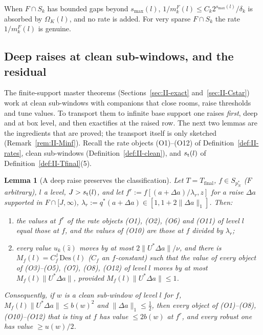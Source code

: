 \documentclass[10pt]{amsart}
\newtheorem{lemma}[theorem]{Lemma}
\theoremstyle{definition}
\theoremstyle{remark}
\newcommand{\zh}{\hat z}
\begin{document}
When $F\cap S_k$ has bounded gaps beyond $s_{\max}(l)$, $1/m^F_k(l)\le
C_k2^{s_{\max}(l)}/\delta_k$ is absorbed by $\Omega_K(l)$, and no rate is
added.  For very sparse $F\cap S_k$ the rate $1/m^F_k(l)$ is genuine.

\subsection{Deep raises at clean sub-windows, and the residual}
\label{subsec:II-residualinf}

The finite-support master theorems (Sections~\ref{sec:II-exact}
and~\ref{sec:II-Cstar}) work at clean sub-windows with companions that close
rooms, raise thresholds and tune values.  To transport them to infinite base
support one raises \emph{first}, deep and at box level, and then
exactifies at the raised row.  The next two lemmas are the ingredients that
are proved; the transport itself is only sketched
(Remark~\ref{rem:II-Minf}).  Recall the rate objects (O1)--(O12) of
Definition~\ref{def:II-rates}, clean sub-windows
(Definition~\ref{def:II-clean}), and $s_{\rm t}(l)$ of
Definition~\ref{def:II-Tfinal}(5).

\begin{lemma}[A deep raise preserves the classification]\label{lem:II-DR}
Let $T=T_{\mathrm{final}}$, $f\in S_{p_N^*}$ \textup{(}$F$ arbitrary\textup{)},
$l$ a level, $J>s_{\rm t}(l)$, and let $f^r:=f[(a+\Delta a)/\lambda_r,z]$ for a
raise $\Delta a$ supported in $F\cap[J,\infty)$, $\lambda_r:=q^*(a+\Delta a)
\in[1,1+2\|\Delta a\|_1]$.  Then:
\begin{enumerate}
\item[(a)] the values at $f^r$ of the rate objects \textup{(O1)}, \textup{(O2)},
\textup{(O6)} and \textup{(O11)} of level $l$ equal those at $f$, and the
values of \textup{(O10)} are those at $f$ divided by $\lambda_r$;
\item[(b)] every value $u_k(\zh)$ moves by at most $2\|U^*\Delta a\|/\nu$, and
there is $M_f(l)=C_f^{\,l}\,\mathrm{Des}(l)$ \textup{(}$C_f$ an $f$-constant\textup{)}
such that the value of every object of \textup{(O3)}--\textup{(O5)},
\textup{(O7)}, \textup{(O8)}, \textup{(O12)} of level $l$ moves by at most
$M_f(l)\|U^*\Delta a\|$, provided $M_f(l)\|U^*\Delta a\|\le1$.
\end{enumerate}
Consequently, if $w$ is a clean sub-window of level $l$ for $f$,
$M_f(l)\|U^*\Delta a\|\le b(w)^2$ and $\|\Delta a\|_1\le\frac12$, then every object of
\textup{(O1)}--\textup{(O8)}, \textup{(O10)}--\textup{(O12)} that is tiny at $f$
has value $\le2b(w)$ at $f^r$, and every robust one has value $\ge u(w)/2$.
\end{lemma}
\end{document}
